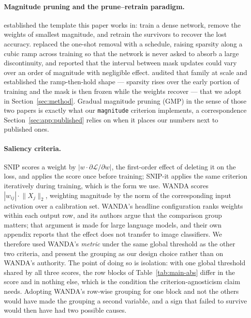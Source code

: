 \paragraph{Magnitude pruning and the prune--retrain paradigm.}
\citet{han2015learning} established the template this paper works in: train a
dense network, remove the weights of smallest magnitude, and retrain the
survivors to recover the lost accuracy. \citet{zhu2018prune} replaced the
one-shot removal with a schedule, raising sparsity along a cubic ramp across
training so that the network is never asked to absorb a large discontinuity, and
reported that the interval between mask updates could vary over an order of
magnitude with negligible effect. \citet{gale2019state} audited that family at
scale and established the ramp-then-hold shape --- sparsity rises over the early
portion of training and the mask is then frozen while the weights recover ---
that we adopt in Section~\ref{sec:method}. Gradual magnitude pruning (GMP) in the
sense of those two papers is exactly what our \texttt{magnitude} criterion
implements, a correspondence Section~\ref{sec:app:published} relies on when it
places our numbers next to published ones.

\paragraph{Saliency criteria.}
SNIP \citep{lee2019snip} scores a weight by
$|w \cdot \partial\mathcal{L}/\partial w|$, the first-order effect of deleting it
on the loss, and applies the score once before training; SNIP-it
\citep{verdenius2020snipit} applies the same criterion iteratively during
training, which is the form we use. WANDA \citep{sun2024wanda} scores
$|w_{ij}| \cdot \lVert X_j \rVert_2$, weighting magnitude by the norm of the
corresponding input activation over a calibration set. WANDA's headline
configuration ranks weights within each output row, and its authors argue that
the comparison group matters; that argument is made for large language models,
and their own appendix reports that the effect does not transfer to image
classifiers. We therefore used WANDA's \emph{metric} under the same global
threshold as the other two criteria, and present the grouping as our design
choice rather than on WANDA's authority. The point of doing so is isolation: with
one global threshold shared by all three scores, the row blocks of
Table~\ref{tab:main-abs} differ in the score and in nothing else, which is the
condition the criterion-agnosticism claim needs. Adopting WANDA's row-wise
grouping for one block and not the others would have made the grouping a second
variable, and a sign that failed to survive would then have had two possible
causes.

